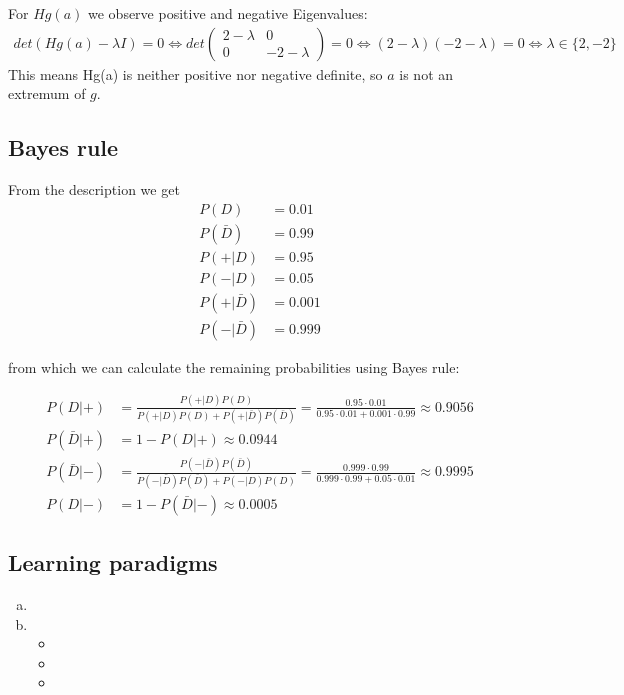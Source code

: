 \documentclass[11pt,a4paper]{article}
\begin{document}
\begin{enumerate}[a)]
For $Hg(a)$ we observe positive and negative Eigenvalues:
\begin{align*}
	det(Hg(a) - \lambda I) = 0 
	\Leftrightarrow det \left(\begin{array}{ccc} 2-\lambda & 0 \\ 0 & -2-\lambda \end{array} \right) = 0
	\Leftrightarrow (2-\lambda)(-2-\lambda) = 0
	\Leftrightarrow \lambda \in \{2,-2\}
\end{align*}
This means Hg(a) is neither positive nor negative definite, so $a$ is not an extremum of $g$.

\end{enumerate}

\subsection{Bayes rule}
From the description we get
\begin{align*}
	P(D) &= 0.01 \\
	P(\bar{D}) &= 0.99 \\
	P(+|D) &= 0.95 \\
	P(-|D) &= 0.05 \\
	P(+|\bar{D}) &= 0.001 \\
	P(-|\bar{D}) &= 0.999
\end{align*}

from which we can calculate the remaining probabilities using Bayes rule:

\begin{align*}
P(D|+) &= \frac{P(+|D) P(D)}{P(+|D)P(D) + P(+|\bar{D})P(\bar{D})}
	= \frac{0.95 \cdot 0.01}{0.95 \cdot 0.01 + 0.001 \cdot 0.99}
	\approx 0.9056 \\
P(\bar{D}|+) &= 1 - P(D|+) \approx 0.0944 \\
P(\bar{D}|-) &= \frac{P(-|\bar{D})P(\bar{D})}{P(-|\bar{D})P(\bar{D}) + P(-|D)P(D)}
	= \frac{0.999 \cdot 0.99}{0.999 \cdot 0.99 + 0.05 \cdot 0.01}
	\approx 0.9995 \\
P(D|-) &= 1 - P(\bar{D}|-) \approx 0.0005
\end{align*}

\subsection{Learning paradigms}

\begin{enumerate}[a)]

\item

\item \begin{itemize}

\item

\item

\item

\end{itemize}

\end{enumerate}
\end{document}

